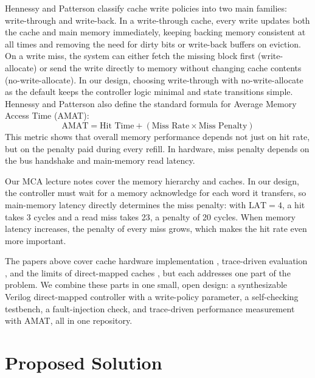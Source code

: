 \documentclass[conference]{IEEEtran}
\begin{document}
Hennessy and Patterson \cite{hp} classify cache write policies into two main families: write-through and write-back. In a write-through cache, every write updates both the cache and main memory immediately, keeping backing memory consistent at all times and removing the need for dirty bits or write-back buffers on eviction. On a write miss, the system can either fetch the missing block first (write-allocate) or send the write directly to memory without changing cache contents (no-write-allocate). In our design, choosing write-through with no-write-allocate as the default keeps the controller logic minimal and state transitions simple. Hennessy and Patterson \cite{hp} also define the standard formula for Average Memory Access Time (AMAT):
\begin{equation}
\text{AMAT} = \text{Hit Time} + (\text{Miss Rate} \times \text{Miss Penalty})
\end{equation}
This metric shows that overall memory performance depends not just on hit rate, but on the penalty paid during every refill. In hardware, miss penalty depends on the bus handshake and main-memory read latency.

Our MCA lecture notes \cite{notes} cover the memory hierarchy and caches. In our design, the controller must wait for a memory acknowledge for each word it transfers, so main-memory latency directly determines the miss penalty: with $\text{LAT}=4$, a hit takes 3 cycles and a read miss takes 23, a penalty of 20 cycles. When memory latency increases, the penalty of every miss grows, which makes the hit rate even more important.

The papers above cover cache hardware implementation \cite{jhamb}, trace-driven evaluation \cite{wang}, \cite{hassan} and the limits of direct-mapped caches \cite{jouppi}, but each addresses one part of the problem. We combine these parts in one small, open design: a synthesizable Verilog direct-mapped controller with a write-policy parameter, a self-checking testbench, a fault-injection check, and trace-driven performance measurement with AMAT, all in one repository.

\section{Proposed Solution}
\end{document}
